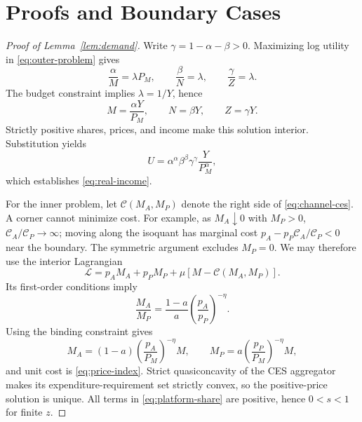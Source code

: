 \appendix
\setcounter{equation}{0}
\renewcommand{\theequation}{A.\arabic{equation}}
\renewcommand{\theHequation}{A.\arabic{equation}}

\section{Proofs and Boundary Cases}
\label{app:proofs}

\begin{proof}[Proof of Lemma~\ref{lem:demand}]
Write \(\gamma=1-\alpha-\beta>0\). Maximizing log utility in
\eqref{eq:outer-problem} gives
\begin{equation}
 \frac{\alpha}{M}=\lambda P_M,\qquad
 \frac{\beta}{N}=\lambda,\qquad
 \frac{\gamma}{Z}=\lambda.
 \label{eq:outer-focs}
\end{equation}
The budget constraint implies \(\lambda=1/Y\), hence
\begin{equation}
 M=\frac{\alpha Y}{P_M},\qquad N=\beta Y,\qquad Z=\gamma Y.
 \label{eq:outer-demands}
\end{equation}
Strictly positive shares, prices, and income make this solution interior.
Substitution yields
\begin{equation}
 U=\alpha^\alpha\beta^\beta\gamma^\gamma
 \frac{Y}{P_M^\alpha},
 \label{eq:indirect-utility-proof}
\end{equation}
which establishes \eqref{eq:real-income}.

For the inner problem, let \(\mathcal C(M_A,M_P)\) denote the right side of
\eqref{eq:channel-ces}. A corner cannot minimize cost. For example, as
\(M_A\downarrow0\) with \(M_P>0\),
\(\mathcal C_A/\mathcal C_P\to\infty\); moving along the isoquant has marginal
cost \(p_A-p_P\mathcal C_A/\mathcal C_P<0\) near the boundary. The symmetric
argument excludes \(M_P=0\). We may therefore use the interior Lagrangian
\begin{equation}
\mathcal L=p_AM_A+p_PM_P+\mu[M-\mathcal C(M_A,M_P)].
 \label{eq:channel-lagrangian}
\end{equation}
Its first-order conditions imply
\begin{equation}
 \frac{M_A}{M_P}
 =\frac{1-a}{a}\left(\frac{p_A}{p_P}\right)^{-\eta}.
 \label{eq:relative-channel-demand}
\end{equation}
Using the binding constraint gives
\begin{equation}
 M_A=(1-a)\left(\frac{p_A}{P_M}\right)^{-\eta}M,\qquad
 M_P=a\left(\frac{p_P}{P_M}\right)^{-\eta}M,
 \label{eq:conditional-demands-proof}
\end{equation}
and unit cost is \eqref{eq:price-index}. Strict quasiconcavity of the CES
aggregator makes its expenditure-requirement set strictly convex, so the
positive-price solution is unique. All terms in \eqref{eq:platform-share} are
positive, hence \(0<s<1\) for finite \(z\).


\end{proof}

